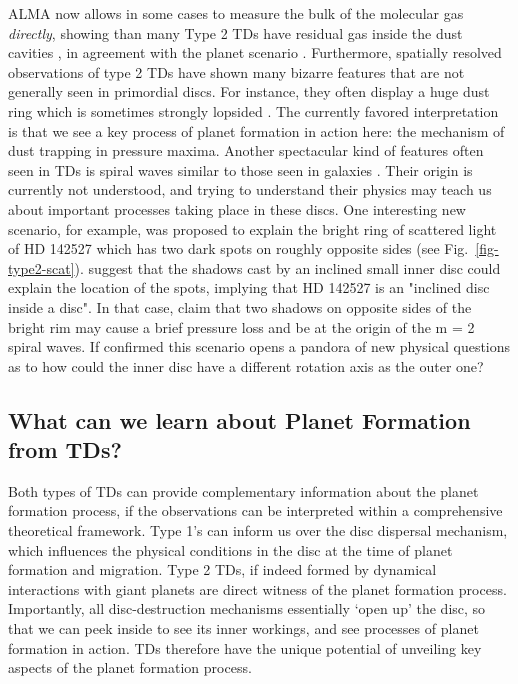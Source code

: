\documentclass[10pt,fleqn,twoside]{article}
\begin{document}

ALMA now allows in some cases to measure the bulk of the molecular gas {\it
  directly}, showing than many Type 2 TDs have residual gas inside the
dust cavities \citep{2016A&A...585A..58V}, in agreement with the
planet scenario \citep[but see also][]{2016arXiv160907510W}.
Furthermore, spatially resolved observations of type
2 TDs have shown many bizarre features that are
not generally seen in primordial discs. For instance, they
  often display a huge dust ring \citep[e.g.,][]{2013Natur.493..191C}
  which is sometimes strongly lopsided 
  \citep[e.g.,][]{2013Sci...340.1199V}. The currently favored interpretation is that we see a
  key process of planet formation in action here: the mechanism of dust
  trapping in pressure maxima. Another spectacular kind of features often
  seen in TDs is spiral waves similar to those seen in galaxies
  \citep[e.g.,][]{2012ApJ...748L..22M, 2015A&A...578L...6B, 2015ApJ...813L...2W}.
  Their origin is currently not
  understood, and trying to understand their physics may teach us about
important processes taking place in these discs. One interesting new
scenario, for example, was proposed to explain the bright ring of scattered light of
HD 142527 which has two dark spots on roughly opposite sides (see Fig.~\ref{fig-type2-scat}). 
\citet{2015ApJ...798L..44M} suggest that the shadows cast by an inclined small inner
disc could explain the location of the spots, implying that HD 142527
is an "inclined disc inside a disc". In that case, \citet{2016ApJ...823L...8M}
 claim that two shadows on opposite sides of the
bright rim may cause a brief pressure loss and be at the origin of the
m = 2 spiral waves. If confirmed this scenario opens a pandora of new
physical questions as to how could the inner disc have a different
rotation axis as the outer one?  \\

\subsection{What can we learn about Planet Formation from TDs? }

Both types of TDs can provide complementary information about the
planet formation process, if the observations can be interpreted
within a comprehensive theoretical framework. Type 1's
can inform us over the disc dispersal mechanism, which influences the
physical conditions in the disc at the time of planet formation and
migration. Type 2 TDs, if indeed formed by dynamical interactions with
giant planets are direct witness of the planet formation
process. Importantly, all disc-destruction mechanisms essentially `open up' the
  disc, so that we can peek inside to see its inner workings, and see
  processes of planet formation in action. TDs therefore
  have the unique potential of unveiling key aspects of the planet formation
process.
\end{document}
